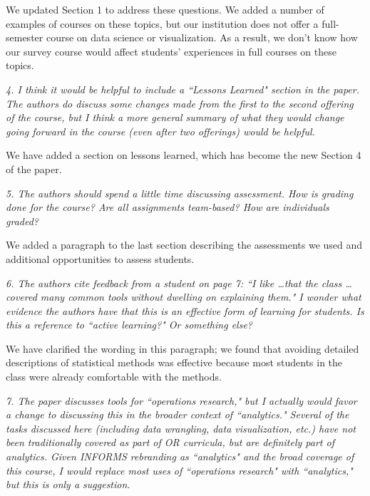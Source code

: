 \documentclass[12pt, letterpaper]{article}
\begin{document}
We updated Section 1 to address these questions. We added a number of examples of courses on these topics, but our institution does not offer a full-semester course on data science or visualization. As a result, we don't know how our survey course would affect students' experiences in full courses on these topics. 

\vspace{0.5cm}

\noindent\textit{4. I think it would be helpful to include a ``Lessons Learned" section in the paper. The authors do discuss some changes made from the first to the second offering of the course, but I think a more general summary of what they would change going forward in the course (even after two offerings) would be helpful.}

We have added a section on lessons learned, which has become the new Section 4 of the paper.

\vspace{0.5cm}

\noindent\textit{5. The authors should spend a little time discussing assessment. How is grading done for the course? Are all assignments team-based? How are individuals graded?}

We added a paragraph to the last section describing the assessments we used and additional opportunities to assess students.

\vspace{0.5cm}

\noindent\textit{6. The authors cite feedback from a student on page 7: ``I like \ldots that the class \ldots covered many common tools without dwelling on explaining them." I wonder what evidence the authors have that this is an effective form of learning for students. Is this a reference to ``active learning?" Or something else?}

We have clarified the wording in this paragraph; we found that avoiding detailed descriptions of statistical methods was effective because most students in the class were already comfortable with the methods.

\vspace{0.5cm}

\noindent\textit{7. The paper discusses tools for ``operations research," but I actually would favor a change to discussing this in the broader context of ``analytics." Several of the tasks discussed here (including data wrangling, data visualization, etc.) have not been traditionally covered as part of OR curricula, but are definitely part of analytics. Given INFORMS rebranding as ``analytics" and
the broad coverage of this course, I would replace most uses of ``operations research" with
``analytics," but this is only a suggestion.}
\end{document}

